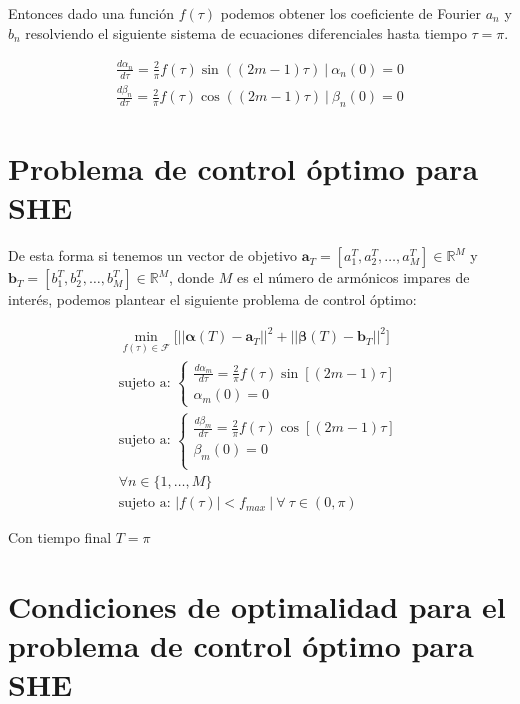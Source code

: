 Entonces dado una función $f(\tau)$ podemos obtener los coeficiente de Fourier $a_n$ y $b_n$ resolviendo el siguiente sistema de ecuaciones diferenciales hasta tiempo $\tau=\pi$.

\begin{gather}
    \frac{d \alpha_n}{d\tau} = \frac{2}{\pi}f(\tau) \sin((2m-1)\tau) \ | \ \alpha_n(0) = 0 \\
    \frac{d \beta_n}{d\tau} = \frac{2}{\pi}f(\tau) \cos((2m-1)\tau) \ | \ \beta_n(0) = 0
\end{gather} 

\section{Problema de control óptimo para SHE}
De esta forma si tenemos un vector de objetivo $\bm{a}_T = [a_1^T,a_2^T,\dots,a_{M}^T] \in \mathbb{R}^M$ y  $\bm{b}_T = [b_1^T,b_2^T,\dots,b_{M}^T] \in \mathbb{R}^M$, donde $M$ es el número de armónicos impares de interés, podemos plantear el siguiente problema de control óptimo:

\begin{gather}
    \min_{f(\tau) \in \mathcal{F}} \big[  || \bm{\alpha}(T) - \bm{a}_T ||^2  + || \bm{\beta}(T) - \bm{b}_T ||^2 \big] \\
    \text{sujeto a: }
    \begin{cases}
        \displaystyle \frac{d \alpha_m}{d\tau} = \frac{2}{\pi}  f(\tau) \sin[(2m-1) \tau ] \\
         \alpha_m(0) = 0       
    \end{cases}
        \\ 
    \text{sujeto a: }
    \begin{cases}
        \displaystyle \frac{d \beta_m}{d\tau}  = \frac{2}{\pi}  f(\tau) \cos[(2m-1) \tau ] \\ 
        \beta_m(0) = 0   \\
    \end{cases} \\
    \forall n \in \{ 1, \dots,M\}  \\ 
    \text{sujeto a: } | f(\tau) | < f_{max} \ | \ \forall \ \tau \in (0,\pi)  
\end{gather}

Con tiempo final $T = \pi$


\section{Condiciones de optimalidad  para el problema de control óptimo para SHE} 


